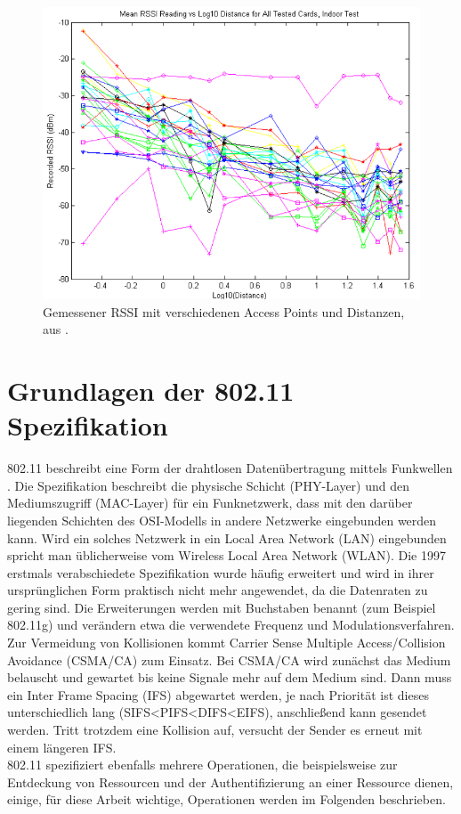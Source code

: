\begin{figure}[h]
  \centering
	\includegraphics[width=\textwidth]{images/luiRSSI.png}
  \caption{Gemessener RSSI mit verschiedenen Access Points und Distanzen, aus \cite{lui2011differences}.}
  \label{fig:luiRSSI}
\end{figure}

\section{Grundlagen der 802.11 Spezifikation}
\label{ch:phase1:sec:grundlagen}
802.11 beschreibt eine Form der drahtlosen Datenübertragung mittels Funkwellen \cite{ieee2012macphy}.
Die Spezifikation beschreibt die physische Schicht (PHY-Layer) und den Mediumszugriff (MAC-Layer) für ein Funknetzwerk, dass mit den darüber liegenden Schichten des OSI-Modells in andere Netzwerke eingebunden werden kann.
Wird ein solches Netzwerk in ein Local Area Network (LAN) eingebunden spricht man üblicherweise vom Wireless Local Area Network (WLAN).
Die 1997 erstmals verabschiedete Spezifikation wurde häufig erweitert und wird in ihrer ursprünglichen Form praktisch nicht mehr angewendet, da die Datenraten zu gering sind.
Die Erweiterungen werden mit Buchstaben benannt (zum Beispiel 802.11g) und verändern etwa die verwendete Frequenz und Modulationsverfahren.\\
Zur Vermeidung von Kollisionen kommt Carrier Sense Multiple Access/Collision Avoidance (CSMA/CA) zum Einsatz.
Bei CSMA/CA wird zunächst das Medium belauscht und gewartet bis keine Signale mehr auf dem Medium sind. 
Dann muss ein Inter Frame Spacing (IFS) abgewartet werden, je nach Priorität ist dieses unterschiedlich lang (SIFS<PIFS<DIFS<EIFS), anschließend kann gesendet werden.
Tritt trotzdem eine Kollision auf, versucht der Sender es erneut mit einem längeren IFS.\\
802.11 spezifiziert ebenfalls mehrere Operationen, die beispielsweise zur Entdeckung von Ressourcen und der Authentifizierung an einer Ressource dienen, einige, für diese Arbeit wichtige, Operationen werden im Folgenden beschrieben.

